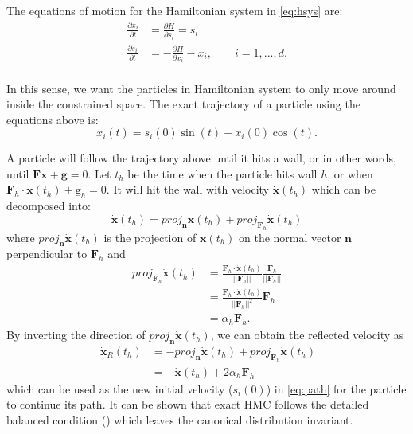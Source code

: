\documentclass{scrartcl}
\numberwithin{equation}{section}
\begin{document}
The equations of motion for the Hamiltonian system in \eqref{eq:hsys} are:    
\begin{equation}\label{eq:heqs2}
\begin{split}
	\frac{\partial x_i}{\partial t} & = \frac{\partial H}{\partial s_i} = s_i \\
	\frac{\partial s_i}{\partial t} & = -\frac{\partial H}{\partial x_i} -x_i, \qquad i=1,...,d.\\
\end{split}
\end{equation}

In this sense, we want the particles in Hamiltonian system to only move around inside the constrained space. The exact trajectory of a particle using the equations above is:    
\begin{equation}\label{eq:path}
	x_i(t) = s_i(0)\sin(t) + x_i(0)\cos(t).
\end{equation}

A particle will follow the trajectory above until it hits a wall, or in other words, until $\textbf{F}\textbf{x} + \textbf{g} = 0$. Let $t_h$ be the time when the particle hits wall $h$, or when $\textbf{F}_h \cdot \textbf{x}(t_h) + \text{g}_h = 0$. It will hit the wall with velocity $\dot{\textbf{x}}(t_h)$ which can be decomposed into:   
\begin{equation}\label{eq:bounce}
	\dot{\textbf{x}}(t_h) = proj_{\textbf{n}}\dot{\textbf{x}}(t_h) + proj_{\textbf{F}_h}\dot{\textbf{x}}(t_h)
\end{equation}
where $proj_{\textbf{n}}\dot{\textbf{x}}(t_h)$ is the projection of $\dot{\textbf{x}}(t_h)$ on the normal vector $\textbf{n}$ perpendicular to $\textbf{F}_h$ and
\begin{equation}\label{eq:proj}
\begin{split}
	proj_{\textbf{F}_h}\dot{\textbf{x}}(t_h) &= \frac{\textbf{F}_h \cdot \dot{\textbf{x}}(t_h)}{||\textbf{F}_h||}\frac{\textbf{F}_h}{||\textbf{F}_h||}\\  
	&= \frac{\textbf{F}_h \cdot \dot{\textbf{x}}(t_h)}{||\textbf{F}_h||^2}\textbf{F}_h \\
	&= \alpha_h\textbf{F}_h.
\end{split}
\end{equation}
By inverting the direction of $proj_{\textbf{n}}\dot{\textbf{x}}(t_h)$, we can obtain the reflected velocity as
\begin{equation}\
\begin{split}
	\dot{\textbf{x}}_R(t_h) & = -proj_{\textbf{n}}\dot{\textbf{x}}(t_h) + proj_{\textbf{F}_h}\dot{\textbf{x}}(t_h) \\
	& = -\dot{\textbf{x}}(t_h) + 2\alpha_h\textbf{F}_h
\end{split}
\end{equation}
which can be used as the new initial velocity ($s_i(0)$) in \eqref{eq:path} for the particle to continue its path. It can be shown that exact HMC follows the detailed balanced condition (\cite{pakman2013exact}) which leaves the canonical distribution invariant.    
\end{document}
